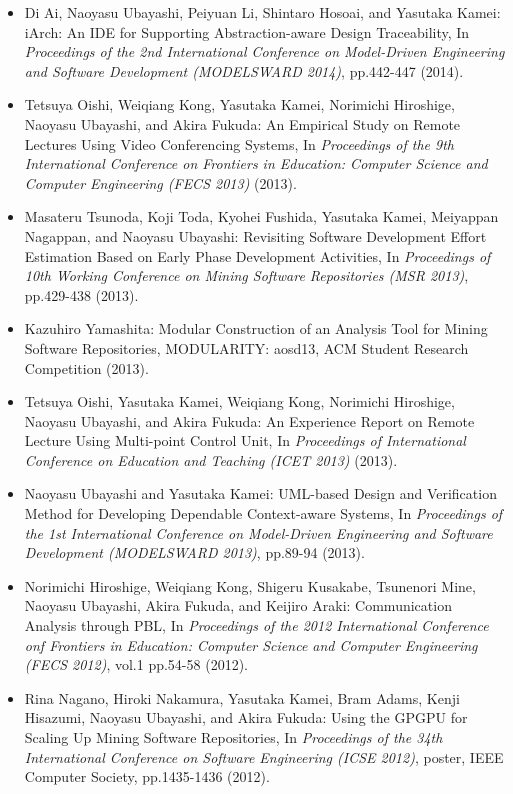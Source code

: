 \documentclass{jarticle}
\begin{document}
\begin{itemize}
\item Di Ai, Naoyasu Ubayashi, Peiyuan Li, Shintaro Hosoai, and Yasutaka Kamei:
iArch: An IDE for Supporting Abstraction-aware Design Traceability,
In {\em Proceedings of the 2nd International Conference on Model-Driven Engineering and Software Development (MODELSWARD 2014)},
pp.442-447 (2014).

\item Tetsuya Oishi, Weiqiang Kong, Yasutaka Kamei, Norimichi Hiroshige, Naoyasu Ubayashi, and Akira Fukuda:
An Empirical Study on Remote Lectures Using Video Conferencing Systems,
In {\em Proceedings of the 9th International Conference on Frontiers in Education: Computer Science and Computer Engineering  (FECS 2013)} (2013).

\item Masateru Tsunoda, Koji Toda, Kyohei Fushida, Yasutaka Kamei, Meiyappan Nagappan, and Naoyasu Ubayashi:
Revisiting Software Development Effort Estimation Based on Early Phase Development Activities,
In {\em Proceedings of 10th Working Conference on Mining Software Repositories (MSR 2013)}, pp.429-438 (2013).

\item Kazuhiro Yamashita:
Modular Construction of an Analysis Tool for Mining Software Repositories,
MODULARITY: aosd13, ACM Student Research Competition (2013).

\item Tetsuya Oishi, Yasutaka Kamei, Weiqiang Kong, Norimichi Hiroshige, Naoyasu Ubayashi, and Akira Fukuda:
An Experience Report on Remote Lecture Using Multi-point Control Unit,
In {\em Proceedings of International Conference on Education and Teaching (ICET 2013)} (2013).

\item Naoyasu Ubayashi and Yasutaka Kamei:
UML-based Design and Verification Method for Developing Dependable Context-aware Systems,
In {\em Proceedings of the 1st International Conference on Model-Driven Engineering and Software Development (MODELSWARD 2013)},
pp.89-94 (2013).

\item Norimichi Hiroshige, Weiqiang Kong, Shigeru Kusakabe, Tsunenori Mine, Naoyasu Ubayashi, Akira Fukuda, and Keijiro Araki:
Communication Analysis through PBL,
In {\em Proceedings of the 2012 International Conference onf Frontiers in Education: Computer Science and Computer Engineering (FECS 2012)},
vol.1 pp.54-58 (2012).

\item Rina Nagano, Hiroki Nakamura, Yasutaka Kamei, Bram Adams, Kenji Hisazumi, Naoyasu Ubayashi, and Akira Fukuda:
Using the GPGPU for Scaling Up Mining Software Repositories,
In {\em Proceedings of the 34th International Conference on Software Engineering (ICSE 2012)}, poster,
IEEE Computer Society, pp.1435-1436 (2012).


\end{itemize}
\end{document}
